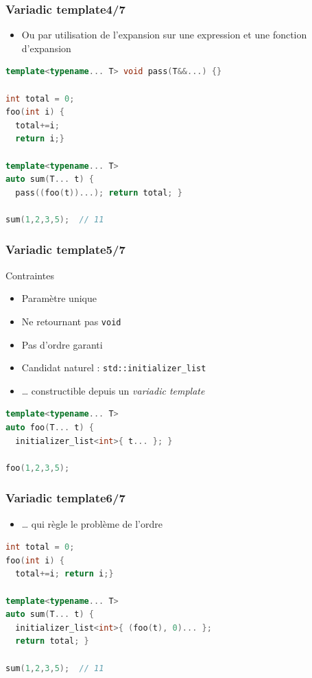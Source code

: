\documentclass[C++.tex]{subfiles}
\begin{document}
\begin{frame}[fragile]
	\frametitle{Variadic template\titlehfill{}4/7}
	\begin{itemize}
		\item Ou par utilisation de l'expansion sur une expression et une fonction d'expansion
	\end{itemize}

	\begin{lstlisting}[language=C++]
template<typename... T> void pass(T&&...) {}

int total = 0;
foo(int i) {
  total+=i; 
  return i;}

template<typename... T>
auto sum(T... t) {
  pass((foo(t))...); return total; }

sum(1,2,3,5);  // 11\end{lstlisting}
\end{frame}

\begin{frame}[fragile]
	\frametitle{Variadic template\titlehfill{}5/7}
	\begin{alertblock}{Contraintes}
		\begin{itemize}
			\item Paramètre unique
			\item Ne retournant pas \lstinline|void|
			\item Pas d'ordre garanti
		\end{itemize}
	\end{alertblock}

	\begin{itemize}
		\item Candidat naturel : \lstinline|std::initializer_list|
		\item \ldots{} constructible depuis un \textit{variadic template}
	\end{itemize}

	\begin{lstlisting}[language=C++]
template<typename... T>
auto foo(T... t) {
  initializer_list<int>{ t... }; }

foo(1,2,3,5);\end{lstlisting}
\end{frame}

\begin{frame}[fragile]
	\frametitle{Variadic template\titlehfill{}6/7}
	\begin{itemize}
		\item \ldots{} qui règle le problème de l'ordre
	\end{itemize}

	\begin{lstlisting}[language=C++]
int total = 0;
foo(int i) {
  total+=i; return i;}

template<typename... T>
auto sum(T... t) {
  initializer_list<int>{ (foo(t), 0)... };
  return total; }

sum(1,2,3,5);  // 11\end{lstlisting}

\end{frame}
\end{document}
